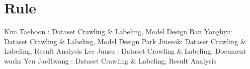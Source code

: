 \documentclass{article}
\begin{document}
\section{Rule}
Kim Taehoon : Dataset Crawling \& Labeling, Model Design \newline
Ban Yonghyu: Dataset Crawling \& Labeling, Model Design \newline
Park Jinseok: Dataset Crawling \& Labeling, Result Analysis \newline
Lee Junsu : Dataset Crawling \& Labeling, Document works \newline
Yeu JaeHwang : Dataset Crawling \& Labeling, Result Analysis \newline




\end{document}

